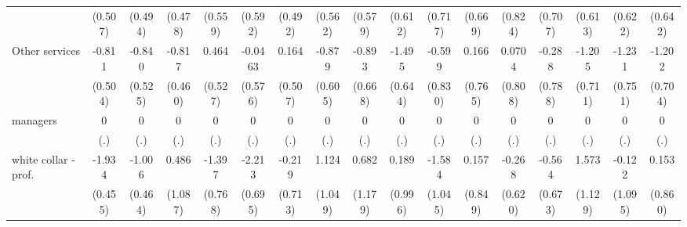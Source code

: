 {\begin{tabular}{l*{16}{c}}
                    &     (0.507)         &     (0.494)         &     (0.478)         &     (0.559)         &     (0.592)         &     (0.492)         &     (0.562)         &     (0.579)         &     (0.612)         &     (0.717)         &     (0.669)         &     (0.824)         &     (0.707)         &     (0.613)         &     (0.622)         &     (0.642)         \\
[1em]
Other services      &      -0.811         &      -0.840         &      -0.817         &       0.464         &     -0.0463         &       0.164         &      -0.879         &      -0.893         &      -1.495\sym{*}  &      -0.599         &       0.166         &      0.0704         &      -0.288         &      -1.205         &      -1.231         &      -1.202         \\
                    &     (0.504)         &     (0.525)         &     (0.460)         &     (0.527)         &     (0.576)         &     (0.507)         &     (0.605)         &     (0.668)         &     (0.644)         &     (0.830)         &     (0.765)         &     (0.808)         &     (0.788)         &     (0.711)         &     (0.751)         &     (0.704)         \\
[1em]
managers            &           0         &           0         &           0         &           0         &           0         &           0         &           0         &           0         &           0         &           0         &           0         &           0         &           0         &           0         &           0         &           0         \\
                    &         (.)         &         (.)         &         (.)         &         (.)         &         (.)         &         (.)         &         (.)         &         (.)         &         (.)         &         (.)         &         (.)         &         (.)         &         (.)         &         (.)         &         (.)         &         (.)         \\
[1em]
white collar - prof.&      -1.934\sym{***}&      -1.006\sym{*}  &       0.486         &      -1.397         &      -2.213\sym{**} &      -0.219         &       1.124         &       0.682         &       0.189         &      -1.584         &       0.157         &      -0.268         &      -0.564         &       1.573         &      -0.122         &       0.153         \\
                    &     (0.455)         &     (0.464)         &     (1.087)         &     (0.768)         &     (0.695)         &     (0.713)         &     (1.049)         &     (1.179)         &     (0.996)         &     (1.045)         &     (0.849)         &     (0.620)         &     (0.673)         &     (1.129)         &     (1.095)         &     (0.860)         \\

\end{tabular}}
